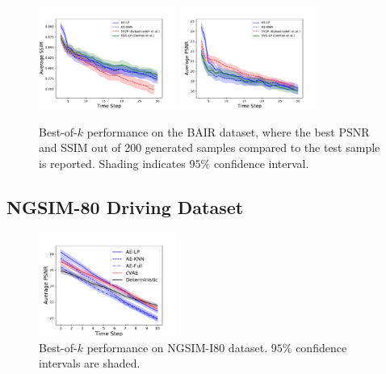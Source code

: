 \documentclass{article}
\begin{document}
\begin{figure}
  \centering
  \includegraphics[width=0.4\textwidth]{images/bair_ssim.pdf}
  \includegraphics[width=0.4\textwidth]{images/bair_psnr.pdf}
  \caption{Best-of-$k$ performance on the BAIR dataset, where the best PSNR and SSIM out of 200 generated samples compared to the test sample is reported. Shading indicates $95\%$ confidence interval. }
  \label{bair}
\end{figure}


\subsection{NGSIM-80 Driving Dataset}




\begin{figure}
  \centering
  \includegraphics[width=0.4\textwidth]{images/best_of_k_i80.pdf}
  \caption{Best-of-$k$ performance on NGSIM-I80 dataset. $95\%$ confidence intervals are shaded.}
  \label{i80-bestofk}
\end{figure}
\end{document}
